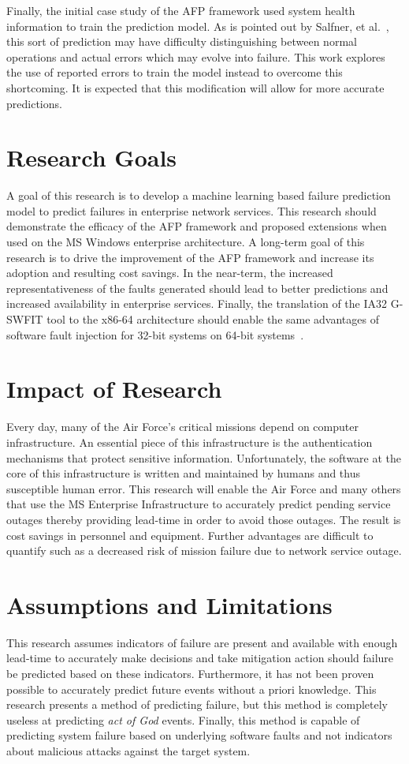 Finally, the initial case study of the \ac{AFP} framework used system health
information to train the prediction model.  As is pointed out by Salfner, et
al.~\cite{salfnerSurvey}, this sort of prediction may have difficulty
distinguishing between normal operations and actual errors which may evolve
into failure.  This work explores the use of reported errors to train the model
instead to overcome this shortcoming.  It is expected that this modification
will allow for more accurate predictions.

\section{Research Goals} 
A goal of this research is to develop a machine learning based failure
prediction model to predict failures in enterprise network services.  This
research should demonstrate the efficacy of the \ac{AFP} framework and proposed
extensions when used on the \ac{MS} Windows enterprise architecture.  A
long-term goal of this research is to drive the improvement of the \ac{AFP}
framework and increase its adoption and resulting cost savings.  In the
near-term, the increased representativeness of the faults generated should lead
to better predictions and increased availability in enterprise services.
Finally, the translation of the IA32 \ac{G-SWFIT} tool to the x86-64
architecture should enable the same advantages of software fault injection for
32-bit systems on 64-bit systems~\cite{gswfit}.

\section{Impact of Research}
Every day, many of the Air Force's critical missions depend on computer
infrastructure.  An essential piece of this infrastructure is the
authentication mechanisms that protect  sensitive information.  Unfortunately,
the software at the core of this infrastructure is written and maintained by
humans and thus susceptible human error.  This research will enable the Air
Force and many others that use the \ac{MS} Enterprise Infrastructure to
accurately predict pending service outages thereby providing lead-time in order
to avoid those outages.  The result is cost savings in personnel and equipment.
Further advantages are difficult to quantify such as a decreased risk of
mission failure due to network service outage.

\section{Assumptions and Limitations}
This research assumes indicators of failure are present and available with
enough lead-time to accurately make decisions and take mitigation action should
failure be predicted based on these indicators.  Furthermore, it has not been
proven possible to accurately predict future events without a priori knowledge.
This research presents a method of predicting failure, but this method is
completely useless at predicting \emph{act of God} events.  Finally, this
method is capable of predicting system failure based on underlying software
faults and not indicators about malicious attacks against the target system.

